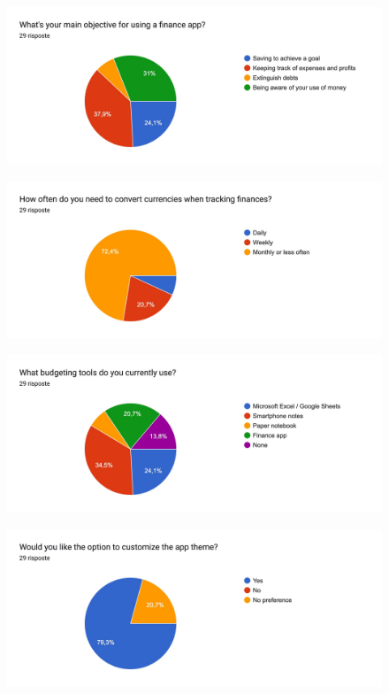 \documentclass[a4paper,12pt]{article}
\begin{document}
\begin{figure}[H]
    \centering
    \includegraphics[width=\linewidth]{imagequest1.jpg}
\end{figure}

\begin{figure}[H]
    \centering
    \includegraphics[width=\linewidth]{imagequest2.jpg}
\end{figure}

\begin{figure}[H]
    \centering
    \includegraphics[width=\linewidth]{imagequest3.jpg}
\end{figure}

\begin{figure}[H]
    \centering
    \includegraphics[width=\linewidth]{imagequest4.jpg}
\end{figure}
\end{document}
